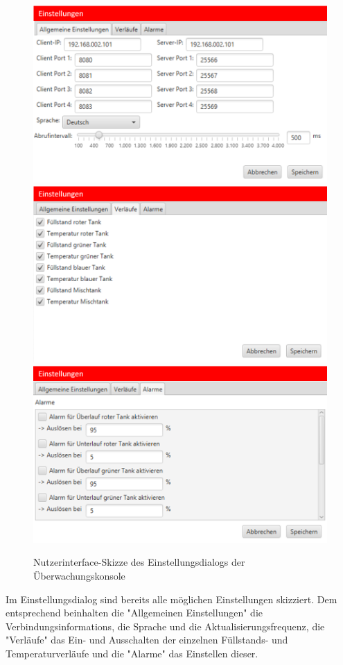 \documentclass[parskip=full]{scrartcl}
\begin{document}
\begin{figure}[H]
	\centering
	\includegraphics[scale=0.5]{media/ui-client/ui-uw-settings1.png}
	\includegraphics[scale=0.5]{media/ui-client/ui-uw-settings2.png}
	\includegraphics[scale=0.5]{media/ui-client/ui-uw-settings3.png}
	\caption{Nutzerinterface-Skizze des Einstellungsdialogs der Überwachungskonsole}
\end{figure}
Im Einstellungsdialog sind bereits alle möglichen Einstellungen skizziert. Dem entsprechend beinhalten die "Allgemeinen Einstellungen" die \glspl{Verbindungsinformation}, die Sprache und die Aktualisierungsfrequenz, die "Verläufe" das Ein- und Ausschalten der einzelnen Füllstands- und Temperaturverläufe und die "Alarme" das Einstellen dieser.
\end{document}
